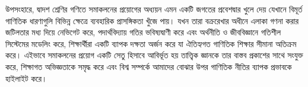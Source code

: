 উপসংহারে, দ্বাদশ শ্রেণির গণিতে সমাকলনের প্রয়োগের অধ্যয়ন এমন একটি জগতের প্রবেশদ্বার খুলে দেয় যেখানে বিমূর্ত গাণিতিক ধারণাগুলি বিভিন্ন ক্ষেত্রে ব্যবহারিক প্রাসঙ্গিকতা খুঁজে পায়।
যখন তারা বক্ররেখার অধীনে এলাকা গণনা করার জটিলতার মধ্য দিয়ে নেভিগেট করে, পদার্থবিদ্যায় গতির ভবিষ্যদ্বাণী করে এবং অর্থনীতি ও জীববিজ্ঞানে গতিশীল সিস্টেমের মডেলিং করে, শিক্ষার্থীরা একটি ব্যাপক দক্ষতা অর্জন করে যা ঐতিহ্যগত গাণিতিক শিক্ষার সীমানা অতিক্রম করে।
এইভাবে সমাকলনের প্রয়োগ একটি সেতু হিসাবে আবির্ভূত হয় তাত্ত্বিক জ্ঞানকে তার বাস্তব প্রকাশের সাথে সংযুক্ত করে, শিক্ষাগত অভিজ্ঞতাকে সমৃদ্ধ করে এবং বিশ্ব সম্পর্কে আমাদের বোঝার উপর গাণিতিক নীতির ব্যাপক প্রভাবকে হাইলাইট করে।

\newpage
